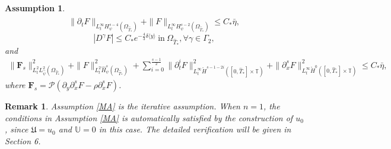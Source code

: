 \documentclass{amsart}
\numberwithin{equation}{section}
\newtheorem{remark}{Remark}[section]
\newtheorem{assumption}{Assumption}[section]
\newcommand\y{{{\langle y \rangle}}}
\begin{document}
\begin{assumption}
\begin{align*}
\end{align*}
$$
\|\partial_{t}F\|_{L_{t}^{\infty}H_{\psi}^{s-4}(\Omega_{\hat{T}_{*}})}+\|F\|_{L_{t}^{\infty}H_{\psi}^{s-2}(\Omega_{\hat{T}_{*}})}
\leq C_{*}\bar{\eta},
$$
$$
|D^{\gamma}F|\leq C_{*}e^{-\frac{4}{3}\delta\y}~\text{in}~\Omega_{\hat{T}_{*}}, \forall \gamma\in\Gamma_{2},
$$
and
\begin{align*}
\|\mathbf{F}_{s}\|_{L_{t}^{2}L_{\hat{\psi}}^{2}(\Omega_{\hat{T}_{*}})}^{2}
+\|F\|_{L_{t}^{2}\hat{H}_{\psi}^{s}(\Omega_{\hat{T}_{*}})}^{2}
+\sum_{i=0}^{\frac{s-1}{2}}\|\partial_{t}^{i}F\|_{L_{t}^{\infty}\mathring{H}^{s-1-2i}([0,\hat{T}_{*}]\times\mathbb{T})}^{2}
+\|\partial_{x}^{s}F\|_{L_{t}^{\infty}\mathring{H}^{0}([0,\hat{T}_{*}]\times\mathbb{T})}^{2}
\leq C_{*}\bar{\eta},
\end{align*}
where $\mathbf{F}_{s}=\mathcal{P}\left(\partial_{y}\partial_{x}^{s}F-\rho \partial_{x}^{s}F\right)$.
\end{assumption}
\begin{remark}
Assumption \ref{MA} is the iterative assumption. When $n=1$, the conditions in Assumption \ref{MA} is automatically satisfied by the construction of $u_{0}$, since $\mathfrak{U}=u_{0}$ and $\mathbb{U}=0$ in this case. The detailed verification will be given in Section 6.
\end{remark}
\end{document}
